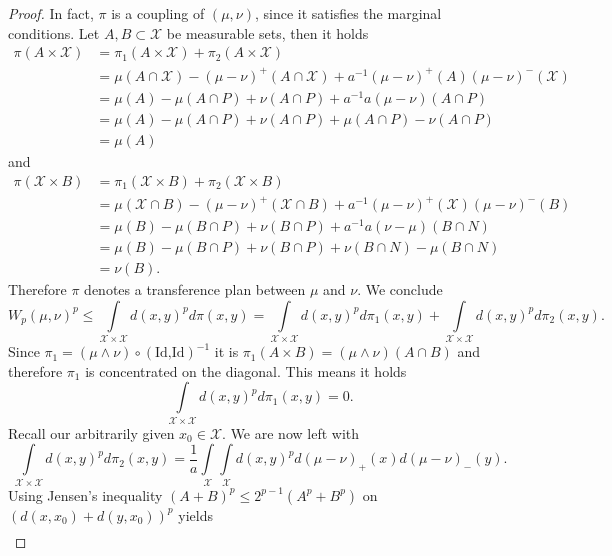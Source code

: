 \documentclass[11pt,a4paper]{article}
\begin{document}
\begin{proof}
In fact, $\pi$ is a coupling of $(\mu,\nu)$, since it satisfies the marginal conditions. Let $A,B\subset\mathcal{X}$ be measurable sets, then it holds
\begin{align*}
\pi(A\times\mathcal{X})&=\pi_1(A\times\mathcal{X})+\pi_2(A\times\mathcal{X})\\&=\mu(A\cap\mathcal{X})-(\mu-\nu)^{+}(A\cap\mathcal{X})+a^{-1}(\mu-\nu)^{+}(A)(\mu-\nu)^{-}(\mathcal{X})\\&=\mu(A)-\mu(A\cap{}P)+\nu(A\cap{}P)+a^{-1}a(\mu-\nu)(A\cap{}P)\\&=\mu(A)-\mu(A\cap{}P)+\nu(A\cap{}P)+\mu(A\cap{}P)-\nu(A\cap{}P)\\&=\mu(A)
\end{align*}
and 
\begin{align*}
\pi(\mathcal{X}\times{}B)&=\pi_1(\mathcal{X}\times{}B)+\pi_2(\mathcal{X}\times{}B)\\&=\mu(\mathcal{X}\cap{}B)-(\mu-\nu)^{+}(\mathcal{X}\cap{}B)+a^{-1}(\mu-\nu)^{+}(\mathcal{X})(\mu-\nu)^{-}(B)\\&=\mu(B)-\mu(B\cap{}P)+\nu(B\cap{}P)+a^{-1}a(\nu-\mu)(B\cap{}N)\\&=\mu(B)-\mu(B\cap{}P)+\nu(B\cap{}P)+\nu(B\cap{}N)-\mu(B\cap{}N)\\&=\nu(B).
\end{align*}
Therefore $\pi$ denotes a transference plan between $\mu$ and $\nu$. We conclude 
\[
W_p(\mu,\nu)^p\leq\int\limits_{\mathcal{X\times{}X}}d(x,y)^pd\pi(x,y)=\int\limits_{\mathcal{X\times{}X}}d(x,y)^pd\pi_1(x,y)+\int\limits_{\mathcal{X\times{}X}}d(x,y)^pd\pi_2(x,y).
\]
Since $\pi_1=(\mu\wedge\nu)\circ{}(\text{Id,Id})^{-1}$ it is $\pi_1(A\times{}B)=(\mu\wedge\nu)(A\cap{}B)$ and therefore $\pi_1$ is concentrated on the diagonal. This means it holds
\[
\int\limits_{\mathcal{X\times{}X}}d(x,y)^pd\pi_1(x,y)=0.
\]
Recall our arbitrarily given $x_0\in\mathcal{X}$. We are now left with
\[
\int\limits_{\mathcal{X\times{}X}}d(x,y)^pd\pi_2(x,y)=\frac{1}{a}\int\limits_{\mathcal{X}}\int\limits_{\mathcal{X}}d(x,y)^pd(\mu-\nu)_{+}(x)d(\mu-\nu)_{-}(y).
\]
Using Jensen's inequality $(A+B)^p\leq{}2^{p-1}(A^p+B^p)$ on $(d(x,x_0)+d(y,x_0))^p$ yields
\begin{align*}

\end{align*}
\end{proof}
\end{document}
